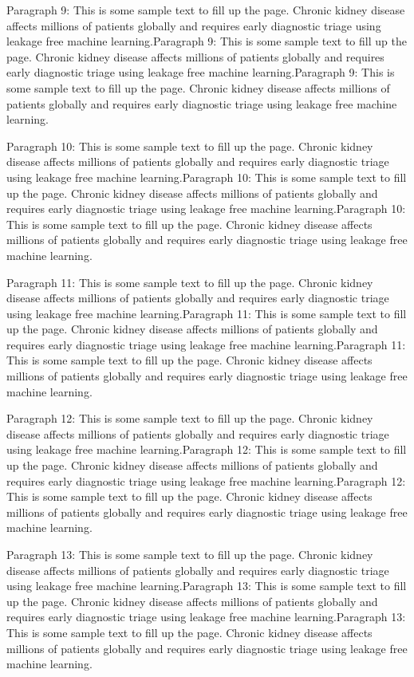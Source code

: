 \documentclass{IEEEtran}
\begin{document}
Paragraph 9: This is some sample text to fill up the page. Chronic kidney disease affects millions of patients globally and requires early diagnostic triage using leakage free machine learning.Paragraph 9: This is some sample text to fill up the page. Chronic kidney disease affects millions of patients globally and requires early diagnostic triage using leakage free machine learning.Paragraph 9: This is some sample text to fill up the page. Chronic kidney disease affects millions of patients globally and requires early diagnostic triage using leakage free machine learning.

Paragraph 10: This is some sample text to fill up the page. Chronic kidney disease affects millions of patients globally and requires early diagnostic triage using leakage free machine learning.Paragraph 10: This is some sample text to fill up the page. Chronic kidney disease affects millions of patients globally and requires early diagnostic triage using leakage free machine learning.Paragraph 10: This is some sample text to fill up the page. Chronic kidney disease affects millions of patients globally and requires early diagnostic triage using leakage free machine learning.

Paragraph 11: This is some sample text to fill up the page. Chronic kidney disease affects millions of patients globally and requires early diagnostic triage using leakage free machine learning.Paragraph 11: This is some sample text to fill up the page. Chronic kidney disease affects millions of patients globally and requires early diagnostic triage using leakage free machine learning.Paragraph 11: This is some sample text to fill up the page. Chronic kidney disease affects millions of patients globally and requires early diagnostic triage using leakage free machine learning.

Paragraph 12: This is some sample text to fill up the page. Chronic kidney disease affects millions of patients globally and requires early diagnostic triage using leakage free machine learning.Paragraph 12: This is some sample text to fill up the page. Chronic kidney disease affects millions of patients globally and requires early diagnostic triage using leakage free machine learning.Paragraph 12: This is some sample text to fill up the page. Chronic kidney disease affects millions of patients globally and requires early diagnostic triage using leakage free machine learning.

Paragraph 13: This is some sample text to fill up the page. Chronic kidney disease affects millions of patients globally and requires early diagnostic triage using leakage free machine learning.Paragraph 13: This is some sample text to fill up the page. Chronic kidney disease affects millions of patients globally and requires early diagnostic triage using leakage free machine learning.Paragraph 13: This is some sample text to fill up the page. Chronic kidney disease affects millions of patients globally and requires early diagnostic triage using leakage free machine learning.
\end{document}
